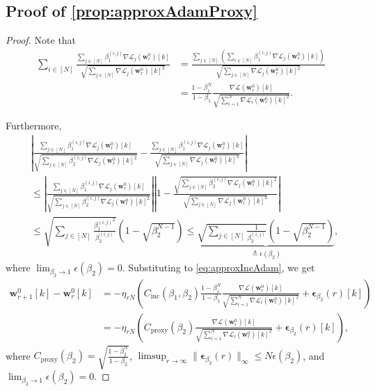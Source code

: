 \documentclass{article} %
\theoremstyle{plain}
\theoremstyle{definition}
\theoremstyle{remark}
\def\bigabs#1{\left|#1\right|}
\def\bigopen#1{\left(#1\right)}
\newcommand{\Ls}{\mathcal{L}}
\def\bw{{\mathbf w}}
\begin{document}
\subsection[Proof of Proposition \ref{prop:approxAdamProxy}]{Proof of \cref{prop:approxAdamProxy}}
\approxAdamProxy*
\begin{proof}
    Note that
    \begin{align*}
        \sum_{i \in [N]}\frac{\sum_{j \in [N]}\beta_1^{(i, j)}\nabla\Ls_{j}(\bw_r^0)[k]}{\sqrt{\sum_{j \in [N]}\nabla\Ls_{j}(\bw_r^0)[k]^2}} &= \frac{\sum_{j \in [N]} \bigopen{\sum_{i \in [N]}\beta_1^{(i, j)}\nabla\Ls_{j}(\bw_r^0)[k]}}{\sqrt{\sum_{j \in [N]}\nabla\Ls_{j}(\bw_r^0)[k]^2}} \\
        &= \frac{1-\beta_1^N}{1-\beta_1}\frac{\nabla \Ls(\bw_r^0)[k]}{\sqrt{\sum_{i=1}^N \nabla\Ls_i(\bw_r^0)[k]^2}}.
    \end{align*}

    Furthermore, 
    \begin{align*}
        &\bigabs{\frac{\sum_{j \in [N]}\beta_1^{(i, j)}\nabla\Ls_{j}(\bw_r^0)[k]}{\sqrt{\sum_{j \in [N]}\beta_2^{(i, j)}\nabla\Ls_{j}(\bw_r^0)[k]^2}} -\frac{\sum_{j \in [N]}\beta_1^{(i, j)}\nabla\Ls_{j}(\bw_r^0)[k]}{\sqrt{\sum_{j \in [N]}\nabla\Ls_{j}(\bw_r^0)[k]^2}}} \\
        &\leq \bigabs{\frac{\sum_{j \in [N]}\beta_1^{(i, j)}\nabla\Ls_{j}(\bw_r^0)[k]}{\sqrt{\sum_{j \in [N]}\beta_2^{(i, j)}\nabla\Ls_{j}(\bw_r^0)[k]^2}}} \bigabs{1-\frac{\sqrt{\sum_{j \in [N]}\beta_2^{(i, j)}\nabla\Ls_{j}(\bw_r^0)[k]^2}}{\sqrt{\sum_{j \in [N]}\nabla\Ls_{j}(\bw_r^0)[k]^2}}} \\
        &\leq \sqrt{\sum_{j \in [N]}\frac{{\beta_1^{(i, j)}}^2}{\beta_2^{(i, j)}}}\bigopen{1-\sqrt{\beta_2^{N-1}}} \leq \underbrace{\sqrt{\sum_{j \in [N]}\frac{1}{\beta_2^{(i, j)}}}\bigopen{1-\sqrt{\beta_2^{N-1}}}}_{\triangleq \epsilon(\beta_2)},
    \end{align*}
    where $\lim_{\beta_2 \rightarrow 1} \epsilon(\beta_2) =0$. Substituting to \cref{eq:approxIncAdam}, we get
    \begin{align*}
        \bw_{r+1}^0[k]-\bw_r^0[k] &= -\eta_{rN} \bigopen{C_{\text{inc}}(\beta_1, \beta_2)\frac{1-\beta_1^N}{1-\beta_1}\frac{\nabla \Ls(\bw_r^0)[k]}{\sqrt{\sum_{i=1}^N \nabla\Ls_i(\bw_r^0)[k]^2}}+\boldsymbol{\epsilon}_{\beta_2}(r)[k]} \\
        &=-\eta_{rN} \bigopen{C_{\text{proxy}}(\beta_2) \frac{\nabla \Ls(\bw_r^0)[k]}{\sqrt{\sum_{i=1}^N \nabla\Ls_i(\bw_r^0)[k]^2}}+\boldsymbol{\epsilon}_{\beta_2}(r)[k]},
    \end{align*}
    where $C_{\text{proxy}}(\beta_2)=\sqrt{\frac{1-\beta_2^N}{1-\beta_2}}$, $\limsup_{r\rightarrow\infty}\|\boldsymbol{\epsilon}_{\beta_2}(r)\|_{\infty} \leq N\epsilon(\beta_2)$, and $\lim_{\beta_2 \rightarrow 1} \epsilon(\beta_2) =0$.
\end{proof}
\end{document}
